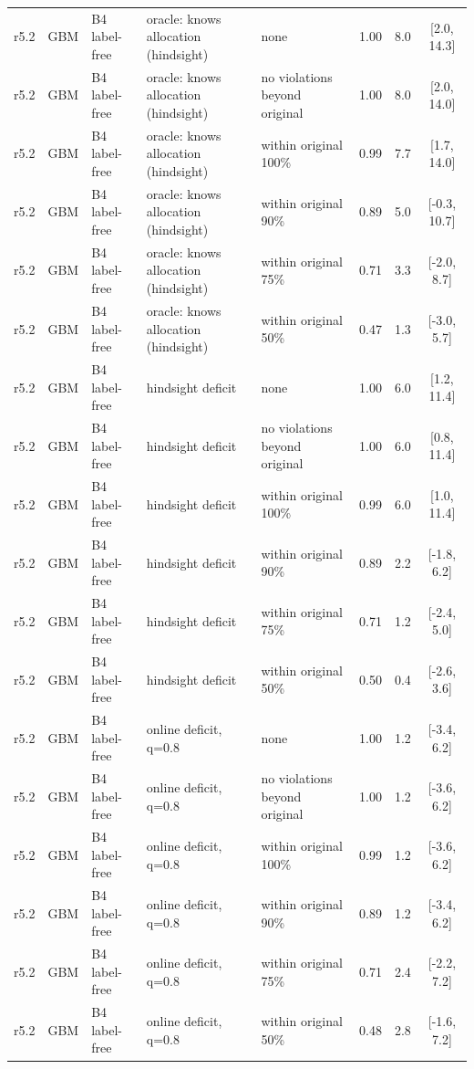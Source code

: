 \documentclass[10pt,onecolumn,letterpaper]{article}
\begin{document}
\begin{longtable}{lllp{4.2cm}p{3.4cm}ccc}
r5.2 & GBM & B4 label-free & oracle: knows allocation (hindsight) & none & 1.00 & 8.0 & [2.0, 14.3] \\
r5.2 & GBM & B4 label-free & oracle: knows allocation (hindsight) & no violations beyond original & 1.00 & 8.0 & [2.0, 14.0] \\
r5.2 & GBM & B4 label-free & oracle: knows allocation (hindsight) & within original 100\% & 0.99 & 7.7 & [1.7, 14.0] \\
r5.2 & GBM & B4 label-free & oracle: knows allocation (hindsight) & within original 90\% & 0.89 & 5.0 & [-0.3, 10.7] \\
r5.2 & GBM & B4 label-free & oracle: knows allocation (hindsight) & within original 75\% & 0.71 & 3.3 & [-2.0, 8.7] \\
r5.2 & GBM & B4 label-free & oracle: knows allocation (hindsight) & within original 50\% & 0.47 & 1.3 & [-3.0, 5.7] \\
r5.2 & GBM & B4 label-free & hindsight deficit & none & 1.00 & 6.0 & [1.2, 11.4] \\
r5.2 & GBM & B4 label-free & hindsight deficit & no violations beyond original & 1.00 & 6.0 & [0.8, 11.4] \\
r5.2 & GBM & B4 label-free & hindsight deficit & within original 100\% & 0.99 & 6.0 & [1.0, 11.4] \\
r5.2 & GBM & B4 label-free & hindsight deficit & within original 90\% & 0.89 & 2.2 & [-1.8, 6.2] \\
r5.2 & GBM & B4 label-free & hindsight deficit & within original 75\% & 0.71 & 1.2 & [-2.4, 5.0] \\
r5.2 & GBM & B4 label-free & hindsight deficit & within original 50\% & 0.50 & 0.4 & [-2.6, 3.6] \\
r5.2 & GBM & B4 label-free & online deficit, q=0.8 & none & 1.00 & 1.2 & [-3.4, 6.2] \\
r5.2 & GBM & B4 label-free & online deficit, q=0.8 & no violations beyond original & 1.00 & 1.2 & [-3.6, 6.2] \\
r5.2 & GBM & B4 label-free & online deficit, q=0.8 & within original 100\% & 0.99 & 1.2 & [-3.6, 6.2] \\
r5.2 & GBM & B4 label-free & online deficit, q=0.8 & within original 90\% & 0.89 & 1.2 & [-3.4, 6.2] \\
r5.2 & GBM & B4 label-free & online deficit, q=0.8 & within original 75\% & 0.71 & 2.4 & [-2.2, 7.2] \\
r5.2 & GBM & B4 label-free & online deficit, q=0.8 & within original 50\% & 0.48 & 2.8 & [-1.6, 7.2] \\

\end{longtable}
\end{document}

